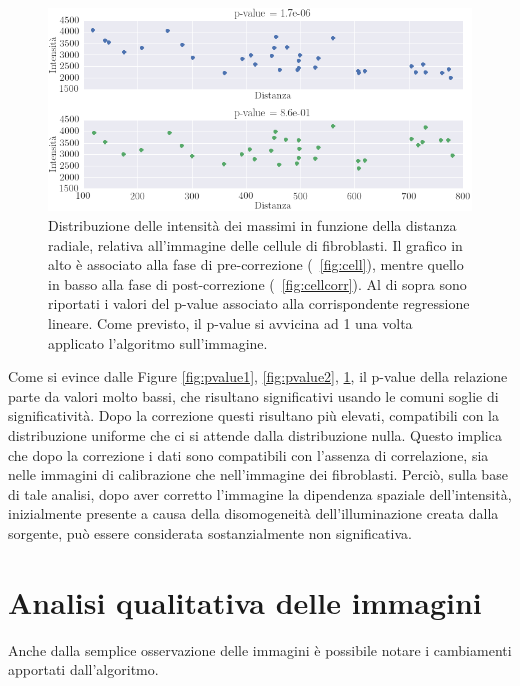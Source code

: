 \begin{figure}
 \centering
 \includegraphics[scale=.55]{img/CAP4pvalue3.png}
 \caption{\small{
 Distribuzione delle intensità dei massimi in funzione della distanza radiale, relativa all'immagine delle cellule di fibroblasti. Il grafico in alto è associato alla fase di pre-correzione (\figurename~\ref{fig:cell}), mentre quello in basso alla fase di post-correzione (\figurename~\ref{fig:cellcorr}). Al di sopra sono riportati i valori del p-value associato alla corrispondente regressione lineare. Come previsto, il p-value si avvicina ad 1 una volta applicato l'algoritmo sull'immagine.}}
 \label{fig:pvalue3}
\end{figure}

Come si evince dalle Figure \ref{fig:pvalue1}, \ref{fig:pvalue2}, \ref{fig:pvalue3}, il p-value della relazione parte da valori molto bassi, che risultano significativi usando le comuni soglie di significatività.
Dopo la correzione questi risultano più elevati, compatibili con la distribuzione uniforme che ci si attende dalla distribuzione nulla.
Questo implica che dopo la correzione i dati sono compatibili con l'assenza di correlazione, sia nelle immagini di calibrazione che nell'immagine dei fibroblasti. 
Perciò, sulla base di tale analisi, dopo aver corretto l'immagine la dipendenza spaziale dell'intensità, inizialmente presente a causa della disomogeneità dell'illuminazione creata dalla sorgente, può essere considerata sostanzialmente non significativa.


\section{Analisi qualitativa delle immagini}

Anche dalla semplice osservazione delle immagini è possibile notare i cambiamenti apportati dall'algoritmo.

